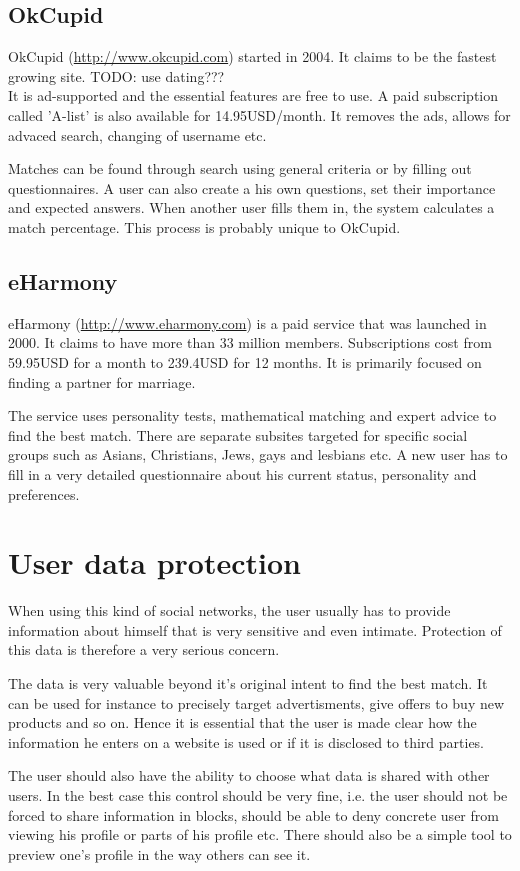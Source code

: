 \documentclass[12pt,oneside]{fithesis}
\begin{document}
		\subsection{OkCupid}
		OkCupid (\url{http://www.okcupid.com}) started in 2004. It claims to be the fastest growing site. TODO: use dating???\\
		It is ad-supported and the essential features are free to use. A paid subscription called 'A-list' is also available for 14.95USD/month. It removes the ads, allows for advaced search, changing of username etc.
		
		Matches can be found through search using general criteria or by filling out questionnaires. A user can also create a his own questions, set their importance and expected answers. When another user fills them in, the system calculates a match percentage. This process is probably unique to OkCupid.\cite{website:okcupid}
		\subsection{eHarmony}
		eHarmony (\url{http://www.eharmony.com}) is a paid service that was launched in 2000. It claims to have more than 33 million members. Subscriptions cost from 59.95USD for a month  to 239.4USD for 12 months. It is primarily focused on finding a partner for marriage.
		
		The service uses personality tests, mathematical matching and expert advice to find the best match. There are separate subsites targeted for specific social groups such as Asians, Christians, Jews, gays and  lesbians etc. A new user has to fill in a very detailed questionnaire about his current status, personality and preferences.\cite{website:eharmony}
\section{User data protection}
	When using this kind of social networks, the user usually has to provide information about himself that is very sensitive and even intimate. Protection of this data is therefore a very serious concern.
	
	The data is very valuable beyond it's original intent to find the best match. It can be used for instance to precisely target advertisments, give offers to buy new products and so on. Hence it is essential that the user is made clear how the information he enters on a website is used or if it is disclosed to third parties.
	
	The user should also have the ability to choose what data is shared with other users. In the best case this control should be very fine, i.e. the user should not be forced to share information in blocks, should be able to deny concrete user from viewing his profile or parts of his profile etc. There should also be a simple tool to preview one's profile in the way others can see it.
	
\end{document}
